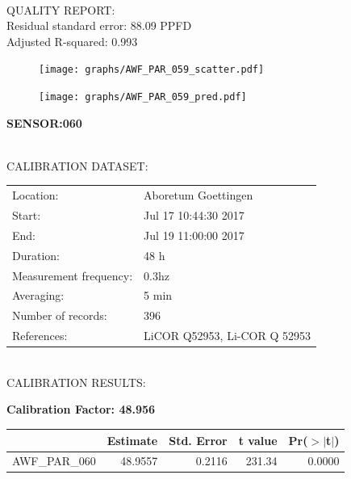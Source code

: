 \documentclass[oneside]{report}
\begin{document}
\hrulefill\\
QUALITY REPORT:\\
Residual standard error: 88.09 PPFD\\
Adjusted R-squared: 0.993



\begin{figure}[H]
  \centering
  \texttt{[image: graphs/AWF\_PAR\_059\_scatter.pdf]}
\end{figure}




\begin{figure}[H]
  \centering
  \texttt{[image: graphs/AWF\_PAR\_059\_pred.pdf]}
\end{figure}

\pagebreak


\begin{center}
\large{\textbf{SENSOR:060}}\\
\end{center}

\hrulefill\\
CALIBRATION DATASET:\\
\begin{table}[h!]
  \centering
  \label{tab:table1}
  \begin{tabular}{ll}
    Location: & Aboretum Goettingen\\ 
    
    
    Start:  & Jul 17 10:44:30 2017 \\
    End:   & Jul 19 11:00:00 2017\\ 
    Duration: & 48 h\\
    Measurement frequency: & 0.3hz\\
    Averaging:  &5 min\\
    Number of records: & 396 \\
    References: & LiCOR Q52953, Li-COR Q 52953 \\
  \end{tabular}
\end{table}

\hrulefill\\
CALIBRATION RESULTS:\\


\begin{center}
\textbf{\large{Calibration Factor: 48.956}}\\
\end{center}
\begin{table}[ht]
\centering
\begin{tabular}{rrrrr}
  \hline
 & Estimate & Std. Error & t value & Pr($>$$|$t$|$) \\ 
  \hline
AWF\_PAR\_060 & 48.9557 & 0.2116 & 231.34 & 0.0000 \\ 
   \hline
\end{tabular}
\end{table}
\end{document}
